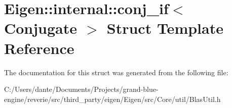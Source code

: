 \hypertarget{struct_eigen_1_1internal_1_1conj__if}{}\section{Eigen\+::internal\+::conj\+\_\+if$<$ Conjugate $>$ Struct Template Reference}
\label{struct_eigen_1_1internal_1_1conj__if}


The documentation for this struct was generated from the following file\+:\begin{DoxyCompactItemize}
\item 
C\+:/\+Users/dante/\+Documents/\+Projects/grand-\/blue-\/engine/reverie/src/third\+\_\+party/eigen/\+Eigen/src/\+Core/util/Blas\+Util.\+h\end{DoxyCompactItemize}
